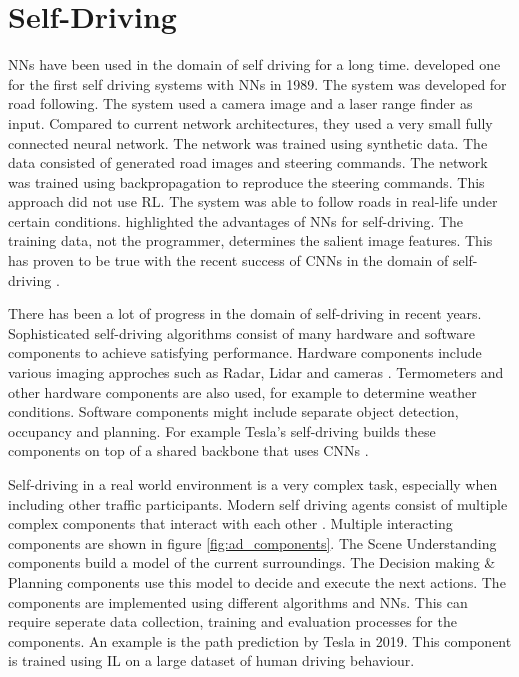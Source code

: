 \section{Self-Driving}

\acp{NN} have been used in the domain of self driving for a long time. \textcite{alvinn} developed one for the first self driving systems with \acp{NN} in 1989. The system was developed for road following. The system used a camera image and a laser range finder as input. Compared to current network architectures, they used a very small fully connected neural network. The network was trained using synthetic data. The data consisted of generated road images and steering commands. The network was trained using backpropagation to reproduce the steering commands. This approach did not use \ac{RL}. The system was able to follow roads in real-life under certain conditions.
\textcite{alvinn} highlighted the advantages of \acp{NN} for self-driving. The training data, not the programmer, determines the salient image features. This has proven to be true with the recent success of \acp{CNN} in the domain of self-driving \textcite{drl_for_ad}.


There has been a lot of progress in the domain of self-driving in recent years. Sophisticated self-driving algorithms consist of many hardware and software components to achieve satisfying performance. Hardware components include various imaging approches such as Radar, Lidar and cameras \autocite{drl_for_ad}. Termometers and other hardware components are also used, for example to determine weather conditions. 
Software components might include separate object detection, occupancy and planning. For example Tesla's self-driving builds these components on top of a shared backbone that uses \acp{CNN} \autocite{howteslaautopilot}.

Self-driving in a real world environment is a very complex task, especially when including other traffic participants. Modern self driving agents consist of multiple complex components that interact with each other \autocite{drl_for_ad}. Multiple interacting components are shown in figure \ref{fig:ad_components}. The Scene Understanding components build a model of the current surroundings. The Decision making \& Planning components use this model to decide and execute the next actions.
The components are implemented using different algorithms and \acp{NN}. This can require seperate data collection, training and evaluation processes for the components. An example is the path prediction by Tesla \textcite{tesla_youtube} in 2019. This component is trained using \ac{IL} on a large dataset of human driving behaviour.

